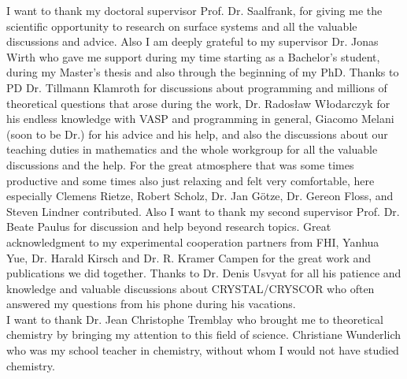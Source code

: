 \documentclass[11pt,DIV=13,BCOR=5mm,a4paper,headinclude]{scrbook}
\begin{document}

\begingroup
\renewcommand{\cleardoublepage}{}
\clearpage
{}
\endgroup
I want to thank my doctoral supervisor Prof. Dr. Saalfrank, for giving me the scientific opportunity to research on surface systems and all the valuable discussions and advice.
Also I am deeply grateful to my supervisor Dr. Jonas Wirth who gave me support during my time starting as a Bachelor's student, during my Master's thesis and also through the beginning of my PhD.
Thanks to PD Dr. Tillmann Klamroth for discussions about programming and millions of theoretical questions that arose during the work, Dr. Rados\l{}aw W\l{}odarczyk for his endless knowledge with VASP and programming in general, Giacomo Melani (soon to be Dr.) for his advice and his help, and also the discussions about our teaching duties in mathematics and the whole workgroup for all the valuable discussions and the help.
For the great atmosphere that was some times productive and some times also just relaxing and felt very comfortable, here especially Clemens Rietze, Robert Scholz, Dr. Jan Götze, Dr. Gereon Floss, and Steven Lindner contributed.
Also I want to thank my second supervisor Prof. Dr. Beate Paulus for discussion and help beyond research topics.
Great acknowledgment to my experimental cooperation partners from FHI, Yanhua Yue, Dr. Harald Kirsch and Dr. R. Kramer Campen for the great work and publications we did together.
Thanks to Dr. Denis Usvyat for all his patience and knowledge and valuable discussions about CRYSTAL/CRYSCOR who often answered my questions from his phone during his vacations.\\
I want to thank Dr. Jean Christophe Tremblay who brought me to theoretical chemistry by bringing my attention to this field of science.
Christiane Wunderlich who was my school teacher in chemistry, without whom I would not have studied chemistry.
\end{document}
